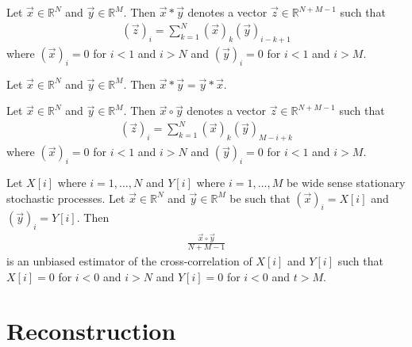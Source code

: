 \documentclass[a4paper, openany, oneside]{memoir}
\begin{document}
\begin{definition}[Convolution]
    Let $\vec{x} \in \mathbb{R}^N$ and $\vec{y} \in \mathbb{R}^M$. Then $\vec{x} \ast \vec{y}$ denotes a vector $\vec{z} \in \mathbb{R}^{N+M-1}$ such that
    \begin{align*}
        (\vec{z})_i = \sum_{k=1}^{N} (\vec{x})_k (\vec{y})_{i-k+1}
    \end{align*}
    where $(\vec{x})_i=0$ for $i < 1$ and $i > N$ and $(\vec{y})_i=0$ for $i < 1$ and $i > M$.
\end{definition}
\begin{theorem} \label{th:conv-comm}
    Let $\vec{x} \in \mathbb{R}^N$ and $\vec{y} \in \mathbb{R}^M$. Then $\vec{x} \ast \vec{y} = \vec{y} \ast \vec{x}$.
\end{theorem}
\begin{definition}
    Let $\vec{x} \in \mathbb{R}^N$ and $\vec{y} \in \mathbb{R}^M$. Then $\vec{x} \circ \vec{y}$ denotes a vector $\vec{z} \in \mathbb{R}^{N+M-1}$ such that
    \begin{align*}
        (\vec{z})_i = \sum_{k=1}^{N} (\vec{x})_k (\vec{y})_{M-i+k}
    \end{align*}
    where $(\vec{x})_i=0$ for $i < 1$ and $i > N$ and $(\vec{y})_i=0$ for $i < 1$ and $i > M$.
\end{definition}
\begin{theorem} \label{th:corr-unbiased}
    Let $X[i]$ where $i = 1,\ldots,N$ and $Y[i]$ where $i = 1,\ldots,M$ be wide sense stationary stochastic processes. Let $\vec{x} \in \mathbb{R}^N$ and $\vec{y} \in \mathbb{R}^M$ be such that $(\vec{x})_i = X[i]$ and $(\vec{y})_i = Y[i]$. Then
    \begin{align*}
        \frac{\vec{x} \circ \vec{y}}{N+M-1} 
    \end{align*}
    is an unbiased estimator of the cross-correlation of $X[i]$ and $Y[i]$ such that $X[i] = 0$ for $i < 0$ and $i > N$ and $Y[i]=0$ for $i < 0$ and $t > M$.
\end{theorem}

\chapter{Reconstruction}
\end{document}

